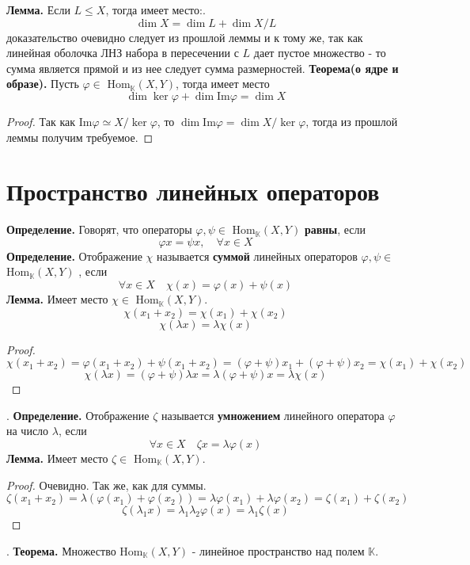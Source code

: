 \documentclass{article}
\newcommand*{\lemma}[1]{\textbf{Лемма.} #1. \newline}
\newcommand*{\theorem}[2]{\textbf{Теорема#1. } #2 \newline}
\newcommand*{\definition}[1]{\textbf{Определение.} #1 \newline}
\newcommand*{\Hom}[2]{Hom$_\mathbb{K}(#1, #2)$}
\begin{document}
\lemma{Если $L \leq X$, тогда имеет место:}
$$
    \dim X = \dim L + \dim X/L
$$
доказательство очевидно следует из прошлой леммы и к тому же, так как линейная оболочка ЛНЗ набора в пересечении с $L$ дает пустое множество - то сумма является прямой и из нее следует сумма размерностей.
\newline 
\newline 
\theorem{(о ядре и образе)}{Пусть $\varphi \in$ \Hom{X}{Y}, тогда имеет место}
$$
    \dim \ker \varphi + \dim \text{Im}\varphi = \dim X
$$
\begin{proof}
    Так как $\text{Im} \varphi \simeq X/\ker \varphi$, то $\dim \text{Im}\varphi = \dim X/\ker\varphi$, тогда из прошлой леммы получим требуемое.
\end{proof}
\section{Пространство линейных операторов}
\definition{Говорят, что операторы $\varphi, \psi \in$ \Hom X Y \textbf{равны}, если}
$$
    \varphi x = \psi x, \quad \forall x \in X
$$
\definition{Отображение $\chi$ называется \textbf{суммой} линейных операторов $\varphi, \psi \in$ \Hom X Y , если}
$$
    \forall x \in X \quad \chi(x) = \varphi(x) + \psi(x)
$$
\lemma{Имеет место $\chi \in$ \Hom X Y}
$$
    \chi(x_1 + x_2) = \chi(x_1) + \chi(x_2)
$$
$$
    \chi(\lambda x) = \lambda \chi(x)
$$
\begin{proof}
    $$
        \chi(x_1 + x_2) = \varphi(x_1 + x_2) + \psi(x_1 + x_2) = (\varphi + \psi)x_1 + (\varphi + \psi)x_2 = \chi(x_1) + \chi(x_2)
    $$
    $$
        \chi(\lambda x) = (\varphi + \psi)\lambda x = \lambda(\varphi + \psi)x = \lambda \chi (x)
    $$
\end{proof}
.\newline 
\definition{Отображение $\zeta$ называется \textbf{умножением} линейного оператора $\varphi$ на число $\lambda$, если}
$$
    \forall x \in X \quad \zeta x = \lambda \varphi(x)
$$
\lemma{Имеет место $\zeta \in$ \Hom X Y}
\begin{proof}
    Очевидно. Так же, как для суммы.
    $$
        \zeta(x_1 + x_2) = \lambda (\varphi(x_1) + \varphi(x_2)) = \lambda \varphi(x_1) + \lambda \varphi(x_2) = \zeta(x_1) + \zeta(x_2) 
    $$
    $$
        \zeta(\lambda_1 x) = \lambda_1\lambda_2 \varphi(x) = \lambda_1 \zeta(x)
    $$
\end{proof}
.\newline
\theorem{}{Множество \Hom X Y - линейное пространство над полем $\mathbb{K}$.}
\end{document}
